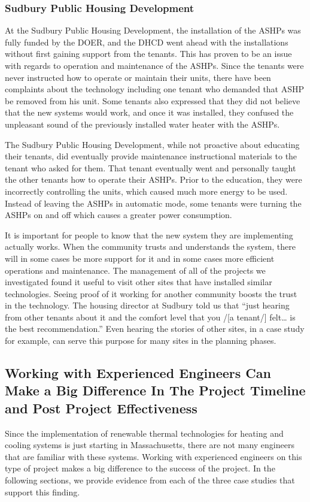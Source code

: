 \subsubsection{Sudbury Public Housing Development}
\par At the Sudbury Public Housing Development, the installation of the ASHPs was fully funded by the DOER, and the DHCD went ahead with the installations without first gaining support from the tenants. This has proven to be an issue with regards to operation and maintenance of the ASHPs. Since the tenants were never instructed how to operate or maintain their units, there have been complaints about the technology including one tenant who demanded that ASHP be removed from his unit. Some tenants also expressed that they did not believe that the new systems would work, and once it was installed, they confused the unpleasant sound of the previously installed water heater with the ASHPs.
\par The Sudbury Public Housing Development, while not proactive about educating their tenants, did eventually provide maintenance instructional materials to the tenant who asked for them. That tenant eventually went and personally taught the other tenants how to operate their ASHPs. Prior to the education, they were incorrectly controlling the units, which caused much more energy to be used. Instead of leaving the ASHPs in automatic mode, some tenants were turning the ASHPs on and off which causes a greater power consumption.
\par It is important for people to know that the new system they are implementing actually works. When the community trusts and understands the system, there will in some cases be more support for it and in some cases more efficient operations and maintenance. The management of all of the projects we investigated found it useful to visit other sites that have installed similar technologies. Seeing proof of it working for another community boosts the trust in the technology. The housing director at Sudbury told us that “just hearing from other tenants about it and the comfort level that you /[a tenant/] felt… is the best recommendation.” Even hearing the stories of other sites, in a case study for example, can serve this purpose for many sites in the planning phases.

\subsection{Working with Experienced Engineers Can Make a Big Difference In The Project Timeline and Post Project Effectiveness}
\par Since the implementation of renewable thermal technologies for heating and cooling systems is just starting in Massachusetts, there are not many engineers that are familiar with these systems. Working with experienced engineers on this type of project makes a big difference to the success of the project. In the following sections, we provide evidence from each of the three case studies that support this finding.

